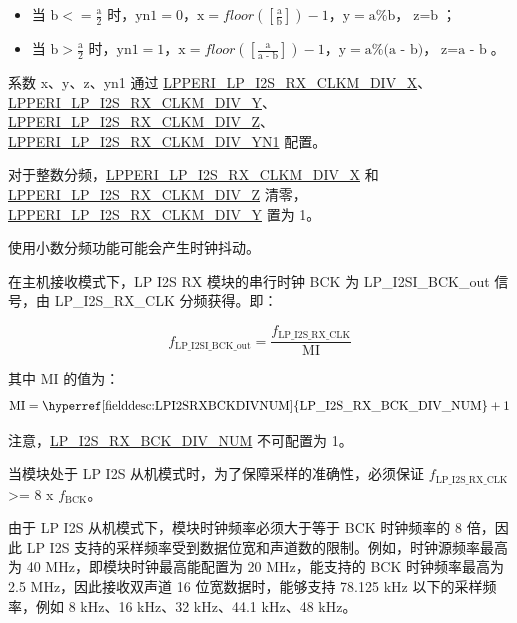 \documentclass[main\_\_CN.tex]{subfiles}
\begin{document}
\begin{itemize}
    \item 当 $\textrm{b} <= \frac{\textrm{a}}{2}$ 时，$\textrm{yn1} = 0$，$\textrm{x} = floor([\frac{\textrm{a}}{\textrm{b}}]) - 1$，$\textrm{y} = \textrm{a}\%\textrm{b}$，$\textrm{z} = \textrm{b}$；
    \item 当 $\textrm{b} > \frac{\textrm{a}}{2}$ 时，$\textrm{yn1}=1$，$\textrm{x} = floor([\frac{\textrm{a}}{\textrm{a - b}}]) - 1$，$\textrm{y} = \textrm{a}\%\textrm{(a - b)}$，$\textrm{z}=\textrm{a - b}$。
\end{itemize}

系数 x、y、z、yn1 通过 \hyperref[fielddesc:LPPERILPI2SRXCLKMDIVX]{LPPERI\_LP\_I2S\_RX\_CLKM\_DIV\_X}、\hyperref[fielddesc:LPPERILPI2SRXCLKMDIVY]{LPPERI\_LP\_I2S\_RX\_CLKM\_DIV\_Y}、\hyperref[fielddesc:LPPERILPI2SRXCLKMDIVZ]{LPPERI\_LP\_I2S\_RX\_CLKM\_DIV\_Z}、\hyperref[fielddesc:LPPERILPI2SRXCLKMDIVYN1]{LPPERI\_LP\_I2S\_RX\_CLKM\_DIV\_YN1} 配置。 

对于整数分频，\hyperref[fielddesc:LPPERILPI2SRXCLKMDIVX]{LPPERI\_LP\_I2S\_RX\_CLKM\_DIV\_X} 和 \hyperref[fielddesc:LPPERILPI2SRXCLKMDIVZ]{LPPERI\_LP\_I2S\_RX\_CLKM\_DIV\_Z} 清零，\hyperref[fielddesc:LPPERILPI2SRXCLKMDIVY]{LPPERI\_LP\_I2S\_RX\_CLKM\_DIV\_Y} 置为 1。

\begin{tiplisting}
使用小数分频功能可能会产生时钟抖动。
\end{tiplisting}

在主机接收模式下，LP I2S RX 模块的串行时钟 BCK 为 LP\_I2SI\_BCK\_out 信号，由 LP\_I2S\_RX\_CLK 分频获得。即：

$$f_{\textrm{LP\_I2SI\_BCK\_out}} = \frac{f_{\textrm{LP\_I2S\_RX\_CLK}}}{\textrm{MI}}$$

其中 MI 的值为：
$$ \textrm{MI} = \textrm{\hyperref[fielddesc:LPI2SRXBCKDIVNUM]{LP\_I2S\_RX\_BCK\_DIV\_NUM}} + 1 $$

\vspace{-1em}
\begin{tiplisting}
注意，\hyperref[fielddesc:LPI2SRXBCKDIVNUM]{LP\_I2S\_RX\_BCK\_DIV\_NUM} 不可配置为 1。
\end{tiplisting}
\vspace{-1em}

当模块处于 LP I2S 从机模式时，为了保障采样的准确性，必须保证 $f_{\textrm{LP\_I2S\_RX\_CLK}}$ >= 8 x $f_{\textrm{BCK}}$。

由于 LP I2S 从机模式下，模块时钟频率必须大于等于 BCK 时钟频率的 8 倍，因此 LP I2S 支持的采样频率受到数据位宽和声道数的限制。例如，时钟源频率最高为 40 MHz，即模块时钟最高能配置为 20 MHz，能支持的 BCK 时钟频率最高为 2.5 MHz，因此接收双声道 16 位宽数据时，能够支持 78.125 kHz 以下的采样频率，例如 8 kHz、16 kHz、32 kHz、44.1 kHz、48 kHz。
\end{document}
